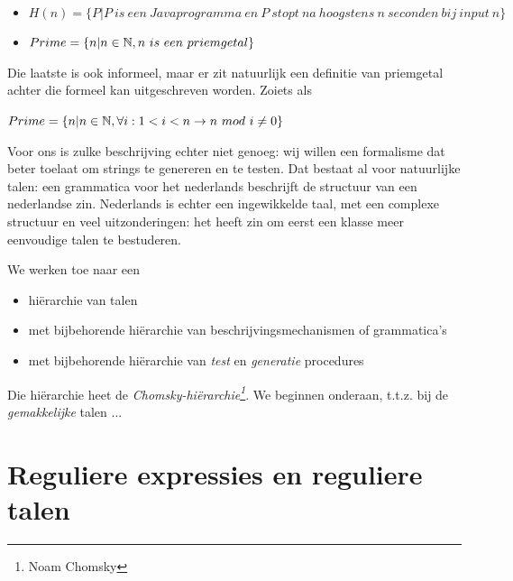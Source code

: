 \begin{vb}
~~
\begin{itemize}
\item 
$H(n) = \{P | P~is~een~Javaprogramma~en~P~stopt~na~hoogstens~n~seconden~bij~input~n\}$
\item 
$Prime = \{n|n \in \mathbb{N}, n~is~een~priemgetal\}$
\end{itemize}
\end{vb}

Die laatste is ook informeel, maar er zit natuurlijk een definitie van
priemgetal achter die formeel kan uitgeschreven worden. Zoiets als 

\hspace{1cm}$Prime = \{n|n \in \mathbb{N}, \forall i:1<i<n \rightarrow n~mod~i \neq 0\}$

Voor ons is zulke beschrijving echter niet genoeg: wij willen een
formalisme dat beter toelaat om strings te genereren en te testen.
Dat bestaat al voor natuurlijke talen: een grammatica voor het
nederlands beschrijft de structuur van een nederlandse zin.
Nederlands is echter een ingewikkelde taal, met een complexe structuur
en veel uitzonderingen: het heeft zin om eerst een klasse meer eenvoudige
talen te bestuderen.


We werken toe naar een 
\begin{itemize}
\item[]
hi\"erarchie van talen

\item[]
met bijbehorende hi\"erarchie van beschrijvingsmechanismen of grammatica's

\item[]
met bijbehorende hi\"erarchie van {\em test} en  {\em generatie} procedures

\end{itemize}

Die hi\"erarchie heet de {\em Chomsky-hi\"erarchie\footnote{Noam
Chomsky}}. We beginnen onderaan, t.t.z. bij de {\em gemakkelijke} talen
...


\newpage

\section{Reguliere expressies en reguliere talen}


